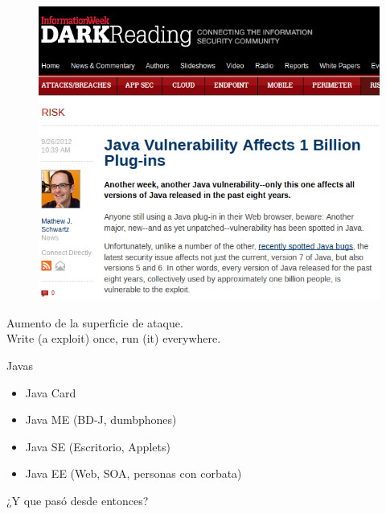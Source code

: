 \documentclass[12pt]{beamer}
\begin{document}
\begin{frame}
\begin{figure}
\centering
\includegraphics[width=\linewidth]{Images/attacksurface}
\end{figure}
\end{frame}


\begin{frame}
\LARGE \centering Aumento de la superficie de ataque. \\ Write (a exploit) once, run (it) everywhere.
\end{frame}

\begin{frame}{Javas}
\begin{itemize}
\item Java Card
\item Java ME (BD-J, dumbphones)
\item \alert<+>{Java SE (Escritorio, Applets)}
\item Java EE (Web, SOA, personas con corbata)
\end{itemize}
\end{frame}

\begin{frame}
\LARGE \centering ¿Y que pasó desde entonces?
\end{frame}
\end{document}
